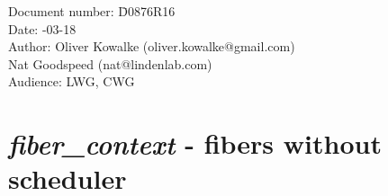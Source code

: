\documentclass[fontsize=10pt,paper=A4,pagesize,DIV=15]{scrartcl}
\begin{document}
\small
\begin{tabbing}
    Document number: \= D0876R16\\
    Date:            -03-18\\
    Author:          \> Oliver Kowalke (oliver.kowalke@gmail.com)\\
                     \> Nat Goodspeed (nat@lindenlab.com)\\
    Audience:        \> LWG, CWG\\
\end{tabbing}

\section*{\emph{fiber\_context} - fibers without scheduler}


\tableofcontents




\newpage























\end{document}
